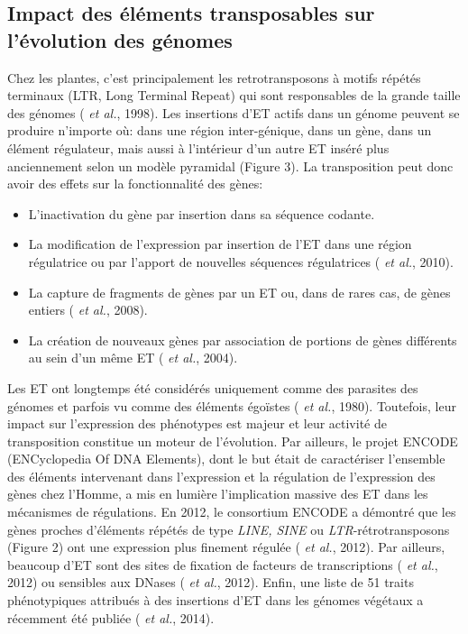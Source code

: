 \documentclass[a4paper, 12pt]{article}
\begin{document}
\begin{onehalfspace}
\subsection{Impact des éléments transposables sur l'évolution des génomes}
Chez les plantes, c'est principalement les retrotransposons à motifs répétés terminaux (LTR, Long Terminal Repeat) qui sont responsables de la grande taille des génomes ( \textit{et al.}, 1998). Les insertions d'ET actifs dans un génome peuvent se produire n'importe où: dans une région inter-génique, dans un gène, dans un élément régulateur, mais aussi à l'intérieur d'un autre ET inséré plus anciennement selon un modèle pyramidal (Figure 3). La transposition peut donc avoir des effets sur la fonctionnalité des gènes:
\begin{itemize}
 \item L'inactivation du gène par insertion dans sa séquence codante.
 \item La modification de l'expression par insertion de l'ET dans une région régulatrice ou par l'apport de nouvelles séquences régulatrices ( \textit{et al.}, 2010).
 \item La capture de fragments de gènes par un ET ou, dans de rares cas, de gènes entiers ( \textit{et al.}, 2008).
 \item La création de nouveaux gènes par association de portions de gènes différents au sein d'un même ET ( \textit{et al.}, 2004).
\end{itemize}

Les ET ont longtemps été considérés uniquement comme des parasites des génomes et parfois vu comme des éléments égoïstes ( \textit{et al.}, 1980). Toutefois, leur impact sur l'expression des phénotypes est majeur et leur activité de transposition constitue un moteur de l'évolution. Par ailleurs, le projet ENCODE (ENCyclopedia Of DNA Elements), dont le but était de caractériser l'ensemble des éléments intervenant dans l'expression et la régulation de l'expression des gènes chez l'Homme, a mis en lumière l'implication massive des ET dans les mécanismes de régulations. En 2012, le consortium ENCODE a démontré que les gènes proches d'éléments répétés de type \textit{LINE, SINE} ou \textit{LTR}-rétrotransposons (Figure 2) ont une expression plus finement régulée ( \textit{et al.}, 2012). Par ailleurs, beaucoup d'ET sont des sites de fixation de facteurs de transcriptions ( \textit{et al.}, 2012) ou sensibles aux DNases ( \textit{et al.}, 2012). Enfin, une liste de 51 traits phénotypiques attribués à des insertions d'ET dans les génomes végétaux a récemment été publiée ( \textit{et al.}, 2014).


\end{onehalfspace}
\end{document}
